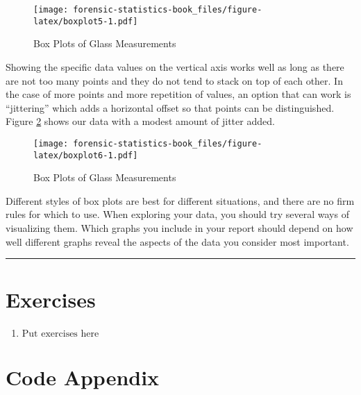 \documentclass[
]{book}
\providecommand{\tightlist}{%
  \setlength{\itemsep}{0pt}\setlength{\parskip}{0pt}}
\begin{document}
\begin{figure}
\centering
\texttt{[image: forensic-statistics-book\_files/figure-latex/boxplot5-1.pdf]}
\caption{\label{fig:boxplot5}Box Plots of Glass Measurements}
\end{figure}

Showing the specific data values on the vertical axis works well as long as there
are not too many points and they do not tend to stack on top of each other.
In the case of more points and more repetition of values, an option that can
work is ``jittering'' which adds a horizontal offset so that points can be
distinguished. Figure \ref{fig:boxplot6} shows our data with a modest
amount of jitter added.

\begin{figure}
\centering
\texttt{[image: forensic-statistics-book\_files/figure-latex/boxplot6-1.pdf]}
\caption{\label{fig:boxplot6}Box Plots of Glass Measurements}
\end{figure}

Different styles of box plots are best for different situations, and there are
no firm rules for which to use. When exploring your data, you should try several
ways of visualizing them. Which graphs you include in your report should depend
on how well different graphs reveal the aspects of the data you consider most
important.

\begin{center}\rule{0.5\linewidth}{0.5pt}\end{center}

\hypertarget{exercises-4}{%
\section{Exercises}\label{exercises-4}}

\begin{enumerate}
\def\labelenumi{\arabic{enumi}.}
\tightlist
\item
  \(\text{Put exercises here}\)
\end{enumerate}

\hypertarget{code-appendix-2}{%
\section{Code Appendix}\label{code-appendix-2}}
\end{document}
